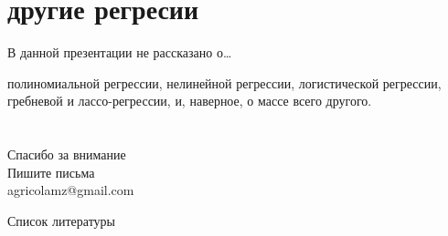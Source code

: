 \section{другие регресии}
\begin{frame}{В данной презентации не рассказано о…}
\begin{itemize}
\mytem полиномиальной регрессии,
\mytem нелинейной регрессии,
\mytem логистической регрессии,
\mytem гребневой и лассо-регрессии,
\mytem и, наверное, о массе всего другого.
\end{itemize}
\end{frame}
\section{}
\begin{frame}
{\huge Спасибо за внимание\bigskip\\
\normalsize Пишите письма\\
agricolamz@gmail.com
\vspace{-130pt}}
\end{frame}
\begin{frame}{Список литературы}
\footnotesize


\end{frame}
